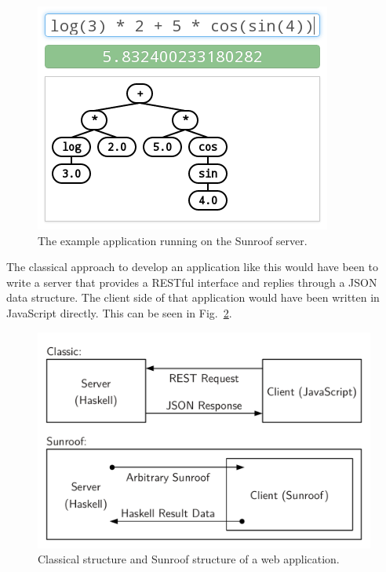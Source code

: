 \documentclass{llncs}
\newcommand{\FigRef}[1]{Fig.~\ref{#1}}
\begin{document}
\begin{figure}[t]%
\begin{center}%
\includegraphics[scale=0.5]{figures/example-application.png}%
\end{center}%
\caption{The example application running on the Sunroof server.}%
\label{fig:example-application}
\end{figure}


The classical approach to develop an application like this would have 
been to write a server that provides a RESTful interface and replies 
through a JSON data structure. 
The client side of that application would have been written in JavaScript
directly.
This can be seen in \FigRef{fig:example-structure}.

\begin{figure}[h]%
\begin{center}%
\includegraphics[scale=0.45,clip=true,trim=0.45cm 0.45cm 0.45cm 0.45cm]{figures/example-structure.pdf}%
\end{center}%
\caption{Classical structure and Sunroof structure of a web application.}%
\label{fig:example-structure}
\end{figure}
\end{document}
